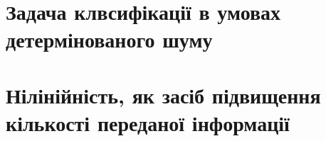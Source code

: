 \section{Задача клвсифікації в умовах детермінованого шуму}

\section{Нілінійність, як засіб підвищення кількості переданої інформації}

